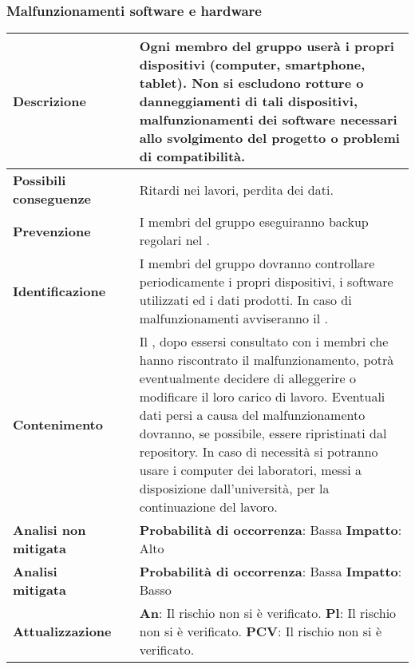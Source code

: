 \subsubsection {Malfunzionamenti software e hardware}
\label{subsec:malfunzionamenttiSwHw}
\small
\begin{table}[H]
	\begin{center}			
		\begin{tabular}{p{2.5cm}p{0.5cm}p{11cm}}
			\arrayrulecolor{lightgray}
			
			\toprule				
			\textbf{Descrizione}
			& &
			Ogni membro del gruppo userà i propri dispositivi (computer, smartphone, tablet).
			Non si escludono rotture o danneggiamenti di tali dispositivi, malfunzionamenti dei software necessari allo svolgimento del progetto o problemi di compatibilità.
			\\
			\midrule
			\textbf{Possibili \newline conseguenze}
			& &
			Ritardi nei lavori, perdita dei dati.
			\\
			\midrule
			\textbf{Prevenzione}
			& &
			I membri del gruppo eseguiranno backup regolari nel \glo{Repository}{repository}.
			\\
			\midrule
			\textbf{Identificazione}
			& &
			I membri del gruppo dovranno controllare periodicamente i propri dispositivi, i software utilizzati ed i dati prodotti. In caso di malfunzionamenti avviseranno il \responsabilediprogetto.
			\\
			\midrule
			\textbf{Contenimento}
			& &
			Il \responsabilediprogetto, dopo essersi consultato con i membri che hanno riscontrato il malfunzionamento, potrà eventualmente decidere di alleggerire o modificare il loro carico di lavoro. Eventuali dati persi a causa del malfunzionamento dovranno, se possibile, essere ripristinati dal repository. In caso di necessità si potranno usare i computer dei laboratori, messi a disposizione dall'università, per la continuazione del lavoro.
			\\
			\midrule
			\textbf{Analisi \newline non mitigata}
			& &
			\textbf{Probabilità di occorrenza}: Bassa
			\newline
			\textbf{Impatto}: Alto
			\\
			\midrule
			\textbf{Analisi \newline mitigata}
			& &
			\textbf{Probabilità di occorrenza}: Bassa
			\newline
			\textbf{Impatto}: Basso
			\\
			\midrule
			\textbf{Attualizzazione}
			& &
			\textbf{An}: Il rischio non si è verificato.
			\newline
			\textbf{Pl}: Il rischio non si è verificato.
			\newline
			\textbf{PCV}: Il rischio non si è verificato.
			\\
			
			\bottomrule	
		\end{tabular}
	\end{center}
\end{table}			

